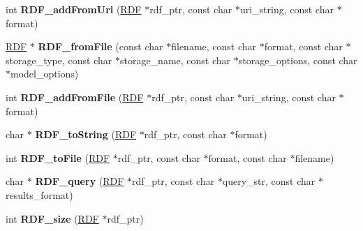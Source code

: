 \begin{DoxyCompactItemize}
\item 
\mbox{\label{namespaceomexmeta_adec4d2ab4b51525933fe7afde29b42d3}} 
int {\bfseries R\+D\+F\+\_\+add\+From\+Uri} (\hyperlink{classomexmeta_1_1RDF}{R\+DF} $\ast$rdf\+\_\+ptr, const char $\ast$uri\+\_\+string, const char $\ast$format)
\item 
\mbox{\label{namespaceomexmeta_a6c414c3b4ae513bca35a9608a9fd752d}} 
\hyperlink{classomexmeta_1_1RDF}{R\+DF} $\ast$ {\bfseries R\+D\+F\+\_\+from\+File} (const char $\ast$filename, const char $\ast$format, const char $\ast$storage\+\_\+type, const char $\ast$storage\+\_\+name, const char $\ast$storage\+\_\+options, const char $\ast$model\+\_\+options)
\item 
\mbox{\label{namespaceomexmeta_ad9bcbd4e6b1f93d5d4c8645a37a823cd}} 
int {\bfseries R\+D\+F\+\_\+add\+From\+File} (\hyperlink{classomexmeta_1_1RDF}{R\+DF} $\ast$rdf\+\_\+ptr, const char $\ast$uri\+\_\+string, const char $\ast$format)
\item 
\mbox{\label{namespaceomexmeta_a32f9114a274297acbc44bac3c3ee52a8}} 
char $\ast$ {\bfseries R\+D\+F\+\_\+to\+String} (\hyperlink{classomexmeta_1_1RDF}{R\+DF} $\ast$rdf\+\_\+ptr, const char $\ast$format)
\item 
\mbox{\label{namespaceomexmeta_a7d21ddd436c1a145123bdfeaeaa40663}} 
int {\bfseries R\+D\+F\+\_\+to\+File} (\hyperlink{classomexmeta_1_1RDF}{R\+DF} $\ast$rdf\+\_\+ptr, const char $\ast$format, const char $\ast$filename)
\item 
\mbox{\label{namespaceomexmeta_ad8f80e096c07f028d5c4a281a3e8f093}} 
char $\ast$ {\bfseries R\+D\+F\+\_\+query} (\hyperlink{classomexmeta_1_1RDF}{R\+DF} $\ast$rdf\+\_\+ptr, const char $\ast$query\+\_\+str, const char $\ast$results\+\_\+format)
\item 
\mbox{\label{namespaceomexmeta_acbf6fdf01b402172f7434fa7ec9e057b}} 
int {\bfseries R\+D\+F\+\_\+size} (\hyperlink{classomexmeta_1_1RDF}{R\+DF} $\ast$rdf\+\_\+ptr)
\item 
\mbox{\label{namespaceomexmeta_a934e6c245b9ad896f10e177865095c3f}} 

\end{DoxyCompactItemize}
